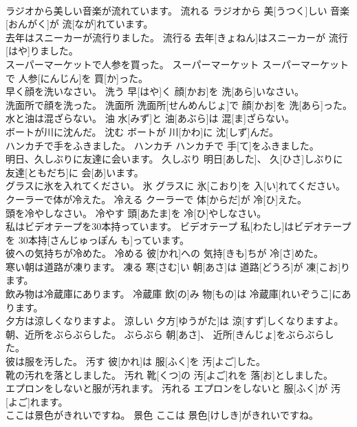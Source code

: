 \documentclass[8pt]{extreport}
\begin{document}
\begin{CJK}{UTF8}{min}
\\	ラジオから美しい音楽が流れています。	流れる	ラジオから 美[うつく]しい 音楽[おんがく]が 流[なが]れています。	
\\	去年はスニーカーが流行りました。	流行る	去年[きょねん]はスニーカーが 流行[はや]りました。	
\\	スーパーマーケットで人参を買った。	スーパーマーケット	スーパーマーケットで 人参[にんじん]を 買[か]った。	
\\	早く顔を洗いなさい。	洗う	早[はや]く 顔[かお]を 洗[あら]いなさい。	
\\	洗面所で顔を洗った。	洗面所	洗面所[せんめんじょ]で 顔[かお]を 洗[あら]った。	
\\	水と油は混ざらない。	油	水[みず]と 油[あぶら]は 混[ま]ざらない。	
\\	ボートが川に沈んだ。	沈む	ボートが 川[かわ]に 沈[しず]んだ。	
\\	ハンカチで手をふきました。	ハンカチ	ハンカチで 手[て]をふきました。	
\\	明日、久しぶりに友達に会います。	久しぶり	明日[あした]、 久[ひさ]しぶりに 友達[ともだち]に 会[あ]います。	
\\	グラスに氷を入れてください。	氷	グラスに 氷[こおり]を 入[い]れてください。	
\\	クーラーで体が冷えた。	冷える	クーラーで 体[からだ]が 冷[ひ]えた。	
\\	頭を冷やしなさい。	冷やす	頭[あたま]を 冷[ひ]やしなさい。	
\\	私はビデオテープを30本持っています。	ビデオテープ	私[わたし]はビデオテープを 30本持[さんじゅっぽん も]っています。	
\\	彼への気持ちが冷めた。	冷める	彼[かれ]への 気持[きも]ちが 冷[さ]めた。	
\\	寒い朝は道路が凍ります。	凍る	寒[さむ]い 朝[あさ]は 道路[どうろ]が 凍[こお]ります。	
\\	飲み物は冷蔵庫にあります。	冷蔵庫	飲[の]み 物[もの]は 冷蔵庫[れいぞうこ]にあります。	
\\	夕方は涼しくなりますよ。	涼しい	夕方[ゆうがた]は 涼[すず]しくなりますよ。	
\\	朝、近所をぶらぶらした。	ぶらぶら	朝[あさ]、 近所[きんじょ]をぶらぶらした。	
\\	彼は服を汚した。	汚す	彼[かれ]は 服[ふく]を 汚[よご]した。	
\\	靴の汚れを落としました。	汚れ	靴[くつ]の 汚[よご]れを 落[お]としました。	
\\	エプロンをしないと服が汚れます。	汚れる	エプロンをしないと 服[ふく]が 汚[よご]れます。	
\\	ここは景色がきれいですね。	景色	ここは 景色[けしき]がきれいですね。	

\end{CJK}
\end{document}
